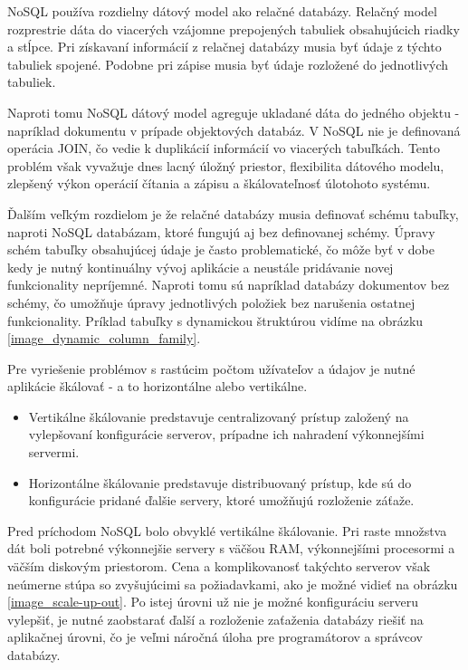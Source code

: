 	NoSQL používa rozdielny dátový model ako relačné databázy. Relačný model rozprestrie dáta do viacerých vzájomne prepojených tabuliek obsahujúcich riadky a stĺpce. Pri získavaní informácií z relačnej databázy musia byť údaje z týchto tabuliek spojené. Podobne pri zápise musia byť údaje rozložené do jednotlivých tabuliek.

	Naproti tomu NoSQL dátový model agreguje ukladané dáta do jedného objektu - napríklad dokumentu v prípade objektových databáz. V NoSQL nie je definovaná operácia JOIN, čo vedie k duplikácií informácií vo viacerých tabuľkách. Tento problém však vyvažuje dnes lacný úložný priestor, flexibilita dátového modelu, zlepšený výkon operácií čítania a zápisu a škálovateľnosť úlotohoto systému.
	
	Ďalším veľkým rozdielom je že relačné databázy musia definovať schému tabuľky, naproti NoSQL databázam, ktoré fungujú aj bez definovanej schémy. Úpravy schém tabuľky obsahujúcej údaje je často problematické, čo môže byť v dobe kedy je nutný kontinuálny vývoj aplikácie a neustále pridávanie novej funkcionality nepríjemné. Naproti tomu sú napríklad databázy dokumentov bez schémy, čo umožňuje úpravy jednotlivých položiek bez narušenia ostatnej funkcionality. Príklad tabuľky s dynamickou štruktúrou vidíme na obrázku \ref{image_dynamic_column_family}.

	
	Pre vyriešenie problémov s rastúcim počtom užívateľov a údajov je nutné aplikácie škálovať - a to horizontálne alebo vertikálne.
	\begin{itemize}
		\item Vertikálne škálovanie predstavuje centralizovaný prístup založený na vylepšovaní konfigurácie serverov, prípadne ich nahradení výkonnejšími servermi.
		\item Horizontálne škálovanie predstavuje distribuovaný prístup, kde sú do konfigurácie pridané ďalšie servery, ktoré umožňujú rozloženie záťaže.
	\end{itemize}
	Pred príchodom NoSQL bolo obvyklé vertikálne škálovanie. Pri raste množstva dát boli potrebné výkonnejšie servery s väčšou RAM, výkonnejšími procesormi a väčším diskovým priestorom. Cena a komplikovanosť takýchto serverov však neúmerne stúpa so zvyšujúcimi sa požiadavkami, ako je možné vidieť na obrázku \ref{image_scale-up-out}. Po istej úrovni už nie je možné konfiguráciu serveru vylepšiť, je nutné zaobstarať ďalší a rozloženie zaťaženia databázy riešiť na aplikačnej úrovni, čo je veľmi náročná úloha pre programátorov a správcov databázy. 
	
